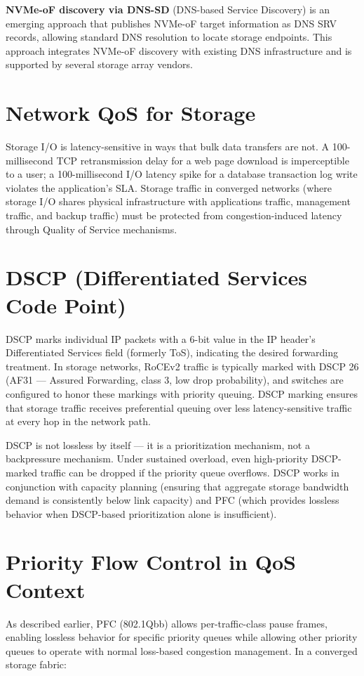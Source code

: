 \textbf{NVMe-oF discovery via DNS-SD} (DNS-based Service Discovery) is an emerging approach that publishes NVMe-oF target information as DNS SRV records, allowing standard DNS resolution to locate storage endpoints. This approach integrates NVMe-oF discovery with existing DNS infrastructure and is supported by several storage array vendors.

\section{Network QoS for Storage}
Storage I/O is latency-sensitive in ways that bulk data transfers are not. A 100-millisecond TCP retransmission delay for a web page download is imperceptible to a user; a 100-millisecond I/O latency spike for a database transaction log write violates the application's SLA. Storage traffic in converged networks (where storage I/O shares physical infrastructure with applications traffic, management traffic, and backup traffic) must be protected from congestion-induced latency through Quality of Service mechanisms.

\section{DSCP (Differentiated Services Code Point)}
DSCP marks individual IP packets with a 6-bit value in the IP header's Differentiated Services field (formerly ToS), indicating the desired forwarding treatment. In storage networks, RoCEv2 traffic is typically marked with DSCP 26 (AF31 --- Assured Forwarding, class 3, low drop probability), and switches are configured to honor these markings with priority queuing. DSCP marking ensures that storage traffic receives preferential queuing over less latency-sensitive traffic at every hop in the network path.

DSCP is not lossless by itself --- it is a prioritization mechanism, not a backpressure mechanism. Under sustained overload, even high-priority DSCP-marked traffic can be dropped if the priority queue overflows. DSCP works in conjunction with capacity planning (ensuring that aggregate storage bandwidth demand is consistently below link capacity) and PFC (which provides lossless behavior when DSCP-based prioritization alone is insufficient).

\section{Priority Flow Control in QoS Context}
As described earlier, PFC (802.1Qbb) allows per-traffic-class pause frames, enabling lossless behavior for specific priority queues while allowing other priority queues to operate with normal loss-based congestion management. In a converged storage fabric:

